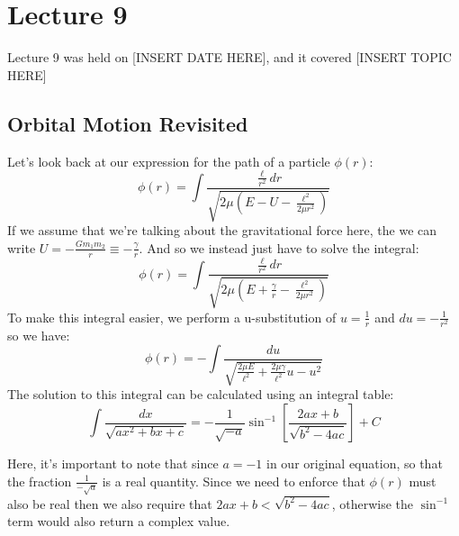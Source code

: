 \chapter{Lecture 9}

Lecture 9 was held on [INSERT DATE HERE], and it covered [INSERT TOPIC HERE]

\section{Orbital Motion Revisited}
Let's look back at our expression for the path of a particle $\phi(r)$:
\[ \phi(r) = \int \frac{\frac{\ell}{r^2} dr}{\sqrt{2\mu\left( E - U - \frac{\ell^2}{2\mu r^2} \right) } }\]
If we assume that we're talking about the gravitational force here, the we can write $U = -\frac{Gm_1m_2}{r} 
\equiv - \frac{\gamma}{r}$. And so we instead just have to solve the integral:
\[ \phi(r) = \int \frac{\frac{\ell}{r^2} dr}{\sqrt{2\mu\left( E + 
\frac{\gamma}{r}-\frac{\ell^2}{2\mu r^2} \right) } }\]
To make this integral easier, we perform a u-substitution of $u = \frac{1}{r}$ and $du = -\frac{1}{r^2}$ so we 
have:
\[ \phi(r) = -\int \frac{du}{\sqrt{\frac{2 \mu E}{\ell^2} + \frac{2 \mu \gamma}{\ell^2}u - u^2} }\]
The solution to this integral can be calculated using an integral table: 
\[ \int \frac{dx}{\sqrt{ax^2 + bx + c} } = -\frac{1}{\sqrt{-a} }\sin^{-1}
\left[ \frac{2ax+b}{\sqrt{b^2 - 4ac} }\right] + C\]
\begin{insight*}{}
		Here, it's important to note that since $a = -1$ in our original equation, so that the fraction
		$\frac{1}{-\sqrt{a} }$ is a real quantity. Since we need to enforce that $\phi(r)$ must also be real 
		then we also require that $2ax + b < \sqrt{b^2 - 4ac}$, otherwise the $\sin^{-1}$ term would also return
		a complex value.
\end{insight*}

